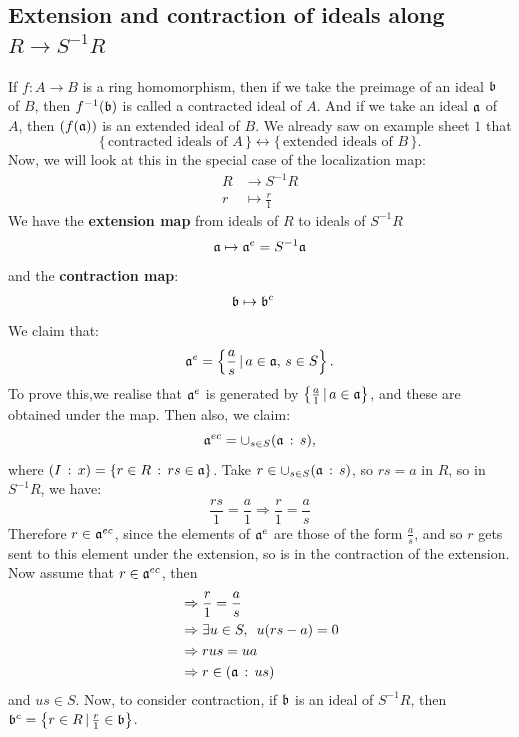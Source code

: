 \documentclass{article}
\begin{document}
\subsection{Extension and contraction of ideals along $R \to S^{-1}R$}
If $f: A \to B$ is a ring homomorphism, then if we take the preimage of an ideal $\mathfrak{b}$ of $B$, then $f^{-1}(\mathfrak{b})$ is called a contracted ideal of $A$. And if we take an ideal $\mathfrak{a}$ of $A$, then $(f(\mathfrak{a}))$ is an extended ideal of $B$. We already saw on example sheet $1$ that \[ \{\, \text{contracted ideals of $A$} \, \} \leftrightarrow \{ \, \text{extended ideals of $B$} \, \}. \]
Now, we will look at this in the special case of the localization map: \begin{align*}
    R &\to S^{-1}R\\
    r &\mapsto \frac{r}{1}
\end{align*}
We have the \textbf{extension map} from ideals of $R$ to ideals of $S^{-1}R$ \begin{align*}
    \mathfrak{a} &\mapsto \mathfrak{a}^{e} = S^{-1}\mathfrak{a}\\
\end{align*}
and the \textbf{contraction map}:
\begin{align*}
    \mathfrak{b} &\mapsto \mathfrak{b}^{c}
\end{align*}
We claim that: \[ \mathfrak{a}^{e} = \left\{ \frac{a}{s} \, | \, a \in \mathfrak{a}, \, s \in S \right\}.\]
To prove this,\newlec we realise that $\mathfrak{a}^{e}$ is generated by $\left\{ \frac{a}{1} \, | \, a \in \mathfrak{a} \right\}$, and these are obtained under the map.\gap 
Then also, we claim: \[ \mathfrak{a}^{ec}= \cup_{s \in S} (\mathfrak{a} \, : \, s),\] where $(I \, : \, x) = \{ r \in R \, : \, rs \in \mathfrak{a}\}$. \gap \proof Take $r \in \cup_{s \in S} (\mathfrak{a} \, : \, s)$, so $rs=a$ in $R$, so in $S^{-1}R$, we have: \[ \frac{rs}{1}=\frac{a}{1} \Longrightarrow \frac{r}{1}=\frac{a}{s}\] Therefore $r \in \mathfrak{a}^{ec}$, since the elements of $\mathfrak{a}^{e}$ are those of the form $\frac{a}{s}$, and so $r$ gets sent to this element under the extension, so is in the contraction of the extension.\gap 
Now assume that $r \in \mathfrak{a}^{ec}$, then \begin{align*}
    &\Rightarrow \frac{r}{1} = \frac{a}{s}\\
    &\Rightarrow \exists u \in S, \, \,\, u(rs-a)=0\\
    &\Rightarrow rus=ua\\
    &\Rightarrow r \in (\mathfrak{a} \, : \, us)
\end{align*}
and $us \in S$.
\endproof
Now, to consider contraction, if $\mathfrak{b}$ is an ideal of $S^{-1}R$, then $\mathfrak{b}^{c} = \left\{ r \in R \, | \, \frac{r}{1} \in \mathfrak{b} \right\}$. \gap 
\end{document}
